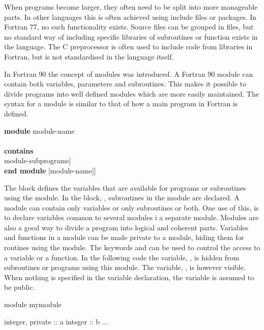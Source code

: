 When programs become larger, they often need to be split into more manageable parts. In other languages this is often achieved using include files or packages. In Fortran 77, no such functionality exists. Source files can be grouped in files, but no standard way of including specific libraries of subroutines or function exists in the language. The C preprocessor is often used to include code from libraries in Fortran, but is not standardised in the language itself. 

In Fortran 90 the concept of modules was introduced. A Fortran 90 module can contain both variables, parameters and subroutines. This makes it possible to divide programs into well defined modules which are more easily maintained. The syntax for a module is similar to that of how a main program in Fortran is defined.

\begin{fsyntax}
\textbf{module} module-name \\
 \\
\protect{[}\textbf{contains} \\
\ftab module-subprograms] \\
\textbf{end module} [module-name]]
\end{fsyntax}

The block  defines the variables that are available for programs or subroutines using the module. In the block, , subroutines in the module are declared. A module can contain only variables or only subroutines or both. One use of this, is to declare variables common to several modules i a separate module. Modules are also a good way to divide a program into logical and coherent parts. Variables and functions in a module can be made private to a module, hiding them for routines using the module. The keywords  and  can be used to control the access to a variable or a function. In the following code the variable, , is hidden from subroutines or programs using this module. The variable, , is however visible. When nothing is specified in the variable declaration, the variable is assumed to be public.

\begin{fortrancodeenv}
module mymodule

    integer, private :: a
    integer :: b
    ...

\end{fortrancodeenv}

